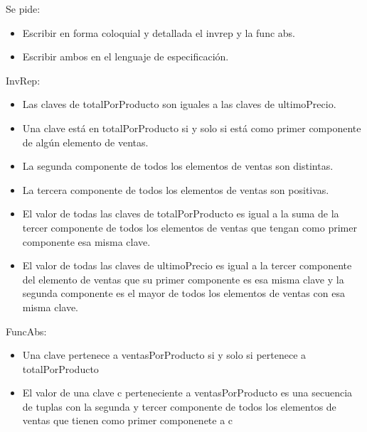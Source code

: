 Se pide:

\begin{itemize}
	\item Escribir en forma coloquial y detallada el invrep y la func abs.
	\item Escribir ambos en el lenguaje de especificación.
\end{itemize}

InvRep:
\begin{itemize}
	\item Las claves de totalPorProducto son iguales a las claves de ultimoPrecio.
	\item Una clave está en totalPorProducto si y solo si está como primer componente de algún elemento de ventas.
	\item La segunda componente de todos los elementos de ventas son distintas.
	\item La tercera componente de todos los elementos de ventas son positivas.
	\item El valor de todas las claves de totalPorProducto es igual a la suma de la tercer componente de todos los elementos de ventas que tengan como primer componente esa misma clave.
	\item El valor de todas las claves de ultimoPrecio es igual a la tercer componente del elemento de ventas que su primer componente es esa misma clave y la segunda componente es el mayor de todos los elementos de ventas con esa misma clave.
\end{itemize}

FuncAbs:
\begin{itemize}
	\item Una clave pertenece a ventasPorProducto si y solo si pertenece a totalPorProducto
	\item El valor de una clave c perteneciente a ventasPorProducto es una secuencia de tuplas con la segunda y tercer componente de todos los elementos de ventas que tienen como primer componenete a c
\end{itemize}
\pagebreak




